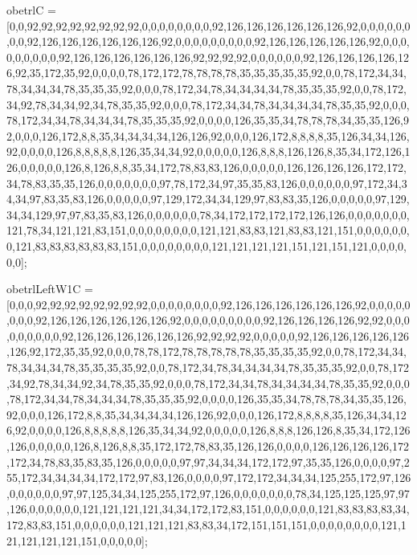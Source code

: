 obetrlC = [0,0,92,92,92,92,92,92,92,92,0,0,0,0,0,0,0,0,92,126,126,126,126,126,126,92,0,0,0,0,0,0,0,0,92,126,126,126,126,126,126,92,0,0,0,0,0,0,0,0,0,92,126,126,126,126,126,92,0,0,0,0,0,0,0,0,0,92,126,126,126,126,126,126,92,92,92,92,0,0,0,0,0,0,92,126,126,126,126,126,92,35,172,35,92,0,0,0,0,78,172,172,78,78,78,78,35,35,35,35,35,92,0,0,78,172,34,34,78,34,34,34,78,35,35,35,92,0,0,0,78,172,34,78,34,34,34,34,78,35,35,35,92,0,0,78,172,34,92,78,34,34,92,34,78,35,35,92,0,0,0,78,172,34,34,78,34,34,34,34,78,35,35,92,0,0,0,78,172,34,34,78,34,34,34,78,35,35,35,92,0,0,0,0,126,35,35,34,78,78,78,34,35,35,126,92,0,0,0,126,172,8,8,35,34,34,34,34,126,126,92,0,0,0,126,172,8,8,8,8,35,126,34,34,126,92,0,0,0,0,126,8,8,8,8,8,126,35,34,34,92,0,0,0,0,0,126,8,8,8,126,126,8,35,34,172,126,126,0,0,0,0,0,126,8,126,8,8,35,34,172,78,83,83,126,0,0,0,0,0,126,126,126,126,172,172,34,78,83,35,35,126,0,0,0,0,0,0,0,97,78,172,34,97,35,35,83,126,0,0,0,0,0,0,97,172,34,34,34,97,83,35,83,126,0,0,0,0,0,97,129,172,34,34,129,97,83,83,35,126,0,0,0,0,0,97,129,34,34,129,97,97,83,35,83,126,0,0,0,0,0,0,78,34,172,172,172,172,126,126,0,0,0,0,0,0,0,121,78,34,121,121,83,151,0,0,0,0,0,0,0,0,121,121,83,83,121,83,83,121,151,0,0,0,0,0,0,0,121,83,83,83,83,83,83,151,0,0,0,0,0,0,0,0,121,121,121,121,151,121,151,121,0,0,0,0,0,0];

obetrlLeftW1C = [0,0,0,92,92,92,92,92,92,92,92,0,0,0,0,0,0,0,0,92,126,126,126,126,126,126,92,0,0,0,0,0,0,0,0,92,126,126,126,126,126,126,92,0,0,0,0,0,0,0,0,0,92,126,126,126,126,92,92,0,0,0,0,0,0,0,0,0,92,126,126,126,126,126,126,92,92,92,92,0,0,0,0,0,92,126,126,126,126,126,126,92,172,35,35,92,0,0,0,78,78,172,78,78,78,78,78,35,35,35,35,92,0,0,78,172,34,34,78,34,34,34,78,35,35,35,35,92,0,0,78,172,34,78,34,34,34,34,78,35,35,35,92,0,0,78,172,34,92,78,34,34,92,34,78,35,35,92,0,0,0,78,172,34,34,78,34,34,34,34,78,35,35,92,0,0,0,78,172,34,34,78,34,34,34,78,35,35,35,92,0,0,0,0,126,35,35,34,78,78,78,34,35,35,126,92,0,0,0,126,172,8,8,35,34,34,34,34,126,126,92,0,0,0,126,172,8,8,8,8,35,126,34,34,126,92,0,0,0,0,126,8,8,8,8,8,126,35,34,34,92,0,0,0,0,0,126,8,8,8,126,126,8,35,34,172,126,126,0,0,0,0,0,126,8,126,8,8,35,172,172,78,83,35,126,126,0,0,0,0,126,126,126,126,172,172,34,78,83,35,83,35,126,0,0,0,0,0,97,97,34,34,34,172,172,97,35,35,126,0,0,0,0,97,255,172,34,34,34,34,172,172,97,83,126,0,0,0,0,97,172,172,34,34,34,125,255,172,97,126,0,0,0,0,0,0,97,97,125,34,34,125,255,172,97,126,0,0,0,0,0,0,0,78,34,125,125,125,97,97,126,0,0,0,0,0,0,121,121,121,121,34,34,172,172,83,151,0,0,0,0,0,0,121,83,83,83,83,34,172,83,83,151,0,0,0,0,0,0,121,121,121,83,83,34,172,151,151,151,0,0,0,0,0,0,0,0,121,121,121,121,121,151,0,0,0,0,0];


